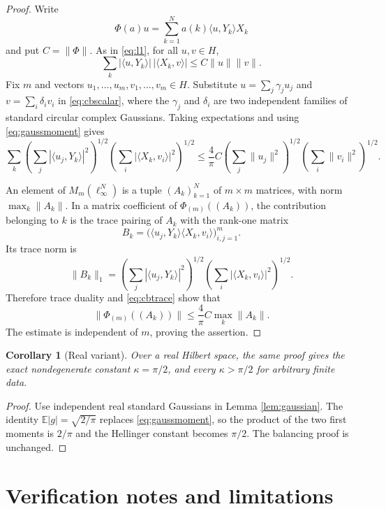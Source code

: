 \documentclass[11pt]{article}
\newtheorem{corollary}{Corollary}
\begin{document}
\begin{proof}
Write
\[
  \Phi(a)u=\sum_{k=1}^N a(k)\langle u,Y_k\rangle X_k
\]
and put $C=\|\Phi\|$.  As in \eqref{eq:l1}, for all $u,v\in H$,
\begin{equation}\label{eq:cbscalar}
 \sum_k |\langle u,Y_k\rangle|\,|\langle X_k,v\rangle|
 \leq C\|u\|\|v\|.
\end{equation}
Fix $m$ and vectors $u_1,\ldots,u_m,v_1,\ldots,v_m\in H$.  Substitute
$u=\sum_j\gamma_ju_j$ and $v=\sum_i\delta_iv_i$ in
\eqref{eq:cbscalar}, where the $\gamma_j$ and $\delta_i$ are two independent
families of standard circular complex Gaussians.  Taking expectations and
using \eqref{eq:gaussmoment} gives
\begin{equation}\label{eq:cbtrace}
 \sum_k
 \left(\sum_j|\langle u_j,Y_k\rangle|^2\right)^{1/2}
 \left(\sum_i|\langle X_k,v_i\rangle|^2\right)^{1/2}
 \leq \frac4\pi C
 \left(\sum_j\|u_j\|^2\right)^{1/2}
 \left(\sum_i\|v_i\|^2\right)^{1/2}.
\end{equation}

An element of $M_m(\ell_\infty^N)$ is a tuple $(A_k)_{k=1}^N$ of
$m\times m$ matrices, with norm $\max_k\|A_k\|$.  In a matrix coefficient
of $\Phi_{(m)}((A_k))$, the contribution belonging to $k$ is the trace
pairing of $A_k$ with the rank-one matrix
\[
 B_k=\big(\langle u_j,Y_k\rangle\langle X_k,v_i\rangle\big)_{i,j=1}^m.
\]
Its trace norm is
\[
 \|B_k\|_1=
 \left(\sum_j|\langle u_j,Y_k\rangle|^2\right)^{1/2}
 \left(\sum_i|\langle X_k,v_i\rangle|^2\right)^{1/2}.
\]
Therefore trace duality and \eqref{eq:cbtrace} show that
\[
 \|\Phi_{(m)}((A_k))\|
 \leq\frac4\pi C\max_k\|A_k\|.
\]
The estimate is independent of $m$, proving the assertion.
\end{proof}

\begin{corollary}[Real variant]
Over a real Hilbert space, the same proof gives the exact nondegenerate
constant $\kappa=\pi/2$, and every $\kappa>\pi/2$ for arbitrary finite
data.
\end{corollary}

\begin{proof}
Use independent real standard Gaussians in Lemma \ref{lem:gaussian}.
The identity $\mathbb E|g|=\sqrt{2/\pi}$ replaces
\eqref{eq:gaussmoment}, so the product of the two first moments is
$2/\pi$ and the Hellinger constant becomes $\pi/2$.  The balancing proof
is unchanged.
\end{proof}

\section*{Verification notes and limitations}
\end{document}
